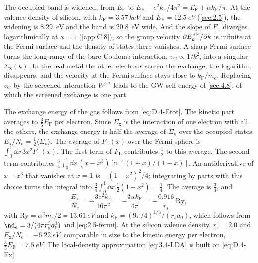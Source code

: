 The occupied band is widened, from $E_{\mathrm{F}}$ to $E_{\mathrm{F}} + e^2k_{\mathrm{F}}/4\pi^2 = E_{\mathrm{F}} + \alpha k_{\mathrm{F}}/\pi$. At the valence density of silicon, with $k_{\mathrm{F}} = \SI{3.57}{keV}$ and $E_{\mathrm{F}} = \SI{12.5}{eV}$ (\cref{sec:2.5}), the widening is \SI{8.29}{eV} and the band is \SI{20.8}{eV} wide. And the slope of $F_{\mathrm{L}}$ diverges logarithmically at $x = 1$ (\cref{app:C.8}), so the group velocity $\partial E^{\mathrm{HF}}_{\bm{k}}/\partial k$ is infinite at the Fermi surface and the density of states there vanishes. A sharp Fermi surface turns the long range of the bare Coulomb interaction, $v_{\mathrm{C}} \propto 1/k^2$, into a singular $\Sigma_{\mathrm{x}}(k)$. In the real metal the other electrons screen the exchange, the logarithm disappears, and the velocity at the Fermi surface stays close to $k_{\mathrm{F}}/m_e$. Replacing $v_{\mathrm{C}}$ by the screened interaction $W^{\mathrm{scr}}$ leads to the GW self-energy of \cref{sec:4.8}, of which the screened exchange is one part.

The exchange energy of the gas follows from \cref{eq:D.4-Etot}. The kinetic part averages to $\tfrac35E_{\mathrm{F}}$ per electron. Since $\Sigma_{\mathrm{x}}$ is the interaction of one electron with all the others, the exchange energy is half the average of $\Sigma_{\mathrm{x}}$ over the occupied states: $E_{\mathrm{x}}/N_e = \tfrac12\langle\Sigma_{\mathrm{x}}\rangle$. The average of $F_{\mathrm{L}}(x)$ over the Fermi sphere is $\int_0^1\dd x\,3x^2F_{\mathrm{L}}(x)$. The first term of $F_{\mathrm{L}}$ contributes $\tfrac12$ to this average. The second term contributes $\tfrac34\int_0^1\dd x\,(x - x^3)\ln[(1 + x)/(1 - x)]$. An antiderivative of $x - x^3$ that vanishes at $x = 1$ is $-(1 - x^2)^2/4$; integrating by parts with this choice turns the integral into $\tfrac34\int_0^1\dd x\,\tfrac12(1 - x^2) = \tfrac14$. The average is $\tfrac34$, and
\begin{equation}
  \frac{E_{\mathrm{x}}}{N_e} = -\frac{3e^2k_{\mathrm{F}}}{16\pi^2} = -\frac{3\alpha k_{\mathrm{F}}}{4\pi} = -\frac{0.916}{r_s}\,\mathrm{Ry} ,
  \label{eq:D.4-Ex}
\end{equation}
with $\mathrm{Ry} = \alpha^2m_e/2 = \SI{13.61}{eV}$ and $k_{\mathrm{F}} = (9\pi/4)^{1/3}/(r_sa_0)$, which follows from $\nd_e = 3/(4\pi r_s^3a_0^3)$ and \cref{eq:2.5-fermi}. At the silicon valence density, $r_s = 2.0$ and $E_{\mathrm{x}}/N_e = \SI{-6.22}{eV}$, comparable in size to the kinetic energy per electron, $\tfrac35E_{\mathrm{F}} = \SI{7.5}{eV}$. The local-density approximation \cref{eq:3.4-LDA} is built on \cref{eq:D.4-Ex}.
